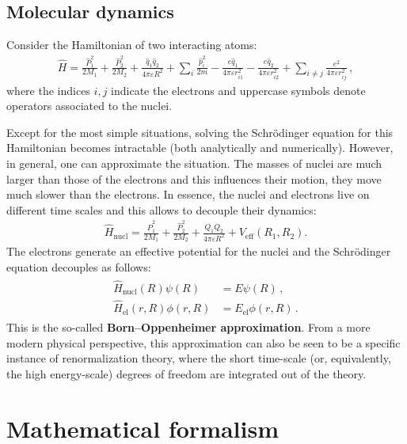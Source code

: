 \subsection{Molecular dynamics}

    Consider the Hamiltonian of two interacting atoms:
    \begin{gather}
        \widehat{H} = \frac{\widehat{P}_1^2}{2M_1} + \frac{\widehat{P}_2^2}{2M_2} + \frac{\widehat{q}_1\widehat{q}_2}{4\pi\varepsilon R^2} + \sum_i\frac{\widehat{p}_i^2}{2m} - \frac{e\widehat{q}_1}{4\pi\varepsilon r_{i1}^2} - \frac{e\widehat{q}_2}{4\pi\varepsilon r_{i2}^2} + \sum_{i\neq j}\frac{e^2}{4\pi\varepsilon r_{ij}^2}\,,
    \end{gather}
    where the indices $i,j$ indicate the electrons and uppercase symbols denote operators associated to the nuclei.

    Except for the most simple situations, solving the Schr\"odinger equation for this Hamiltonian becomes intractable (both analytically and numerically). However, in general, one can approximate the situation. The masses of nuclei are much larger than those of the electrons and this influences their motion, they move much slower than the electrons. In essence, the nuclei and electrons live on different time scales and this allows to decouple their dynamics:
    \begin{gather}
        \widehat{H}_{\text{nucl}} = \frac{\widehat{P}_1^2}{2M_1} + \frac{\widehat{P}_2^2}{2M_2} + \frac{Q_1Q_2}{4\pi\varepsilon R^2} + V_{\text{eff}}(R_1,R_2).
    \end{gather}
    The electrons generate an effective potential for the nuclei and the Schr\"odinger equation decouples as follows:
    \begin{gather}
        \begin{aligned}
            \widehat{H}_{\text{nucl}}(R)\psi(R) &= E\psi(R)\,,\\
            \widehat{H}_{\text{el}}(r,R)\phi(r,R) &= E_{\text{el}}\phi(r,R)\,.
        \end{aligned}
    \end{gather}
    This is the so-called \textbf{Born--Oppenheimer approximation}. From a more modern physical perspective, this approximation can also be seen to be a specific instance of renormalization theory, where the short time-scale (or, equivalently, the high energy-scale) degrees of freedom are integrated out of the theory.

\section{Mathematical formalism}\label{section:mathematical_formalism_qm}
